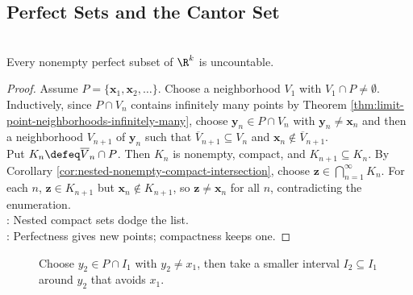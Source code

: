 \subsection{Perfect Sets and the Cantor Set}

\begin{theorem} \label{thm:nonempty-perfect-subset-rk-uncountable} \\
Every nonempty perfect subset of $\R^k$ is uncountable.
\begin{proof}
Assume $P=\{\mathbf{x}_1,\mathbf{x}_2,\ldots\}$. Choose a neighborhood $V_1$ with $V_1\cap P\neq\emptyset$.\\
Inductively, since $P\cap V_n$ contains infinitely many points by Theorem \ref{thm:limit-point-neighborhoods-infinitely-many}, choose $\mathbf{y}_n\in P\cap V_n$ with $\mathbf{y}_n\neq\mathbf{x}_n$ and then a neighborhood $V_{n+1}$ of $\mathbf{y}_n$ such that $\overline{V}_{n+1}\subseteq V_n$ and $\mathbf{x}_n\notin\overline{V}_{n+1}$.\\
Put $K_n\defeq\overline{V}_n\cap P$. Then $K_n$ is nonempty, compact, and $K_{n+1}\subseteq K_n$. By Corollary \ref{cor:nested-nonempty-compact-intersection}, choose $\mathbf{z}\in\bigcap\limits_{n=1}^{\infty}K_n$. For each $n$, $\mathbf{z}\in K_{n+1}$ but $\mathbf{x}_n\notin K_{n+1}$, so $\mathbf{z}\neq\mathbf{x}_n$ for all $n$, contradicting the enumeration.\\
: Nested compact sets dodge the list.\\
: Perfectness gives new points; compactness keeps one.
\end{proof}
\end{theorem}

\begin{figure}[H]
  \centering
  
  \caption{Choose $y_2\in P\cap I_1$ with $y_2\neq x_1$, then take a smaller interval $I_2\subseteq I_1$ around $y_2$ that avoids $x_1$.}
  \label{fig:perfect-set-nested-interval-avoidance}
\end{figure}

